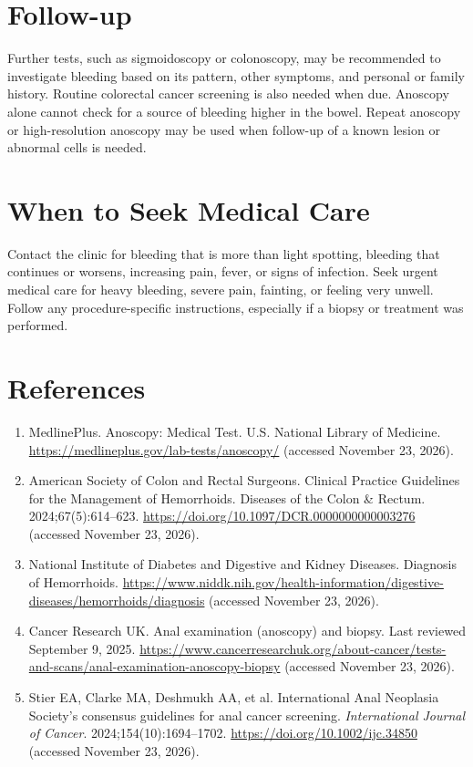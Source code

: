 \section*{Follow-up}
Further tests, such as sigmoidoscopy or colonoscopy, may be recommended to investigate bleeding based on its pattern, other symptoms, and personal or family history. Routine colorectal cancer screening is also needed when due. Anoscopy alone cannot check for a source of bleeding higher in the bowel. Repeat anoscopy or high-resolution anoscopy may be used when follow-up of a known lesion or abnormal cells is needed.

\section*{When to Seek Medical Care}
Contact the clinic for bleeding that is more than light spotting, bleeding that continues or worsens, increasing pain, fever, or signs of infection. Seek urgent medical care for heavy bleeding, severe pain, fainting, or feeling very unwell. Follow any procedure-specific instructions, especially if a biopsy or treatment was performed.

\section*{References}
\begin{enumerate}
  \item MedlinePlus. Anoscopy: Medical Test. U.S. National Library of Medicine. \url{https://medlineplus.gov/lab-tests/anoscopy/} (accessed November 23, 2026).
  \item American Society of Colon and Rectal Surgeons. Clinical Practice Guidelines for the Management of Hemorrhoids. Diseases of the Colon \& Rectum. 2024;67(5):614--623. \url{https://doi.org/10.1097/DCR.0000000000003276} (accessed November 23, 2026).
  \item National Institute of Diabetes and Digestive and Kidney Diseases. Diagnosis of Hemorrhoids. \url{https://www.niddk.nih.gov/health-information/digestive-diseases/hemorrhoids/diagnosis} (accessed November 23, 2026).
  \item Cancer Research UK. Anal examination (anoscopy) and biopsy. Last reviewed September 9, 2025. \url{https://www.cancerresearchuk.org/about-cancer/tests-and-scans/anal-examination-anoscopy-biopsy} (accessed November 23, 2026).
  \item Stier EA, Clarke MA, Deshmukh AA, et al. International Anal Neoplasia Society's consensus guidelines for anal cancer screening. \textit{International Journal of Cancer}. 2024;154(10):1694--1702. \url{https://doi.org/10.1002/ijc.34850} (accessed November 23, 2026).
\end{enumerate}

\clearpage
